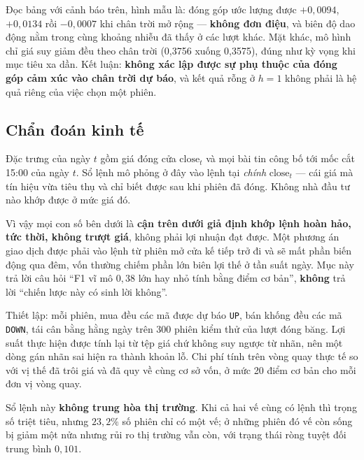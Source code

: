 Đọc bảng với cảnh báo trên, hình mẫu là: đóng góp ước lượng được $+0{,}0094$, $+0{,}0134$
rồi $-0{,}0007$ khi chân trời mở rộng --- \textbf{không đơn điệu}, và biên độ dao động
nằm trong cùng khoảng nhiễu đã thấy ở các lượt khác. Mặt khác, mô hình chỉ giá suy giảm
đều theo chân trời (0,3756 xuống 0,3575), đúng như kỳ vọng khi mục tiêu xa dần. Kết luận:
\textbf{không xác lập được sự phụ thuộc của đóng góp cảm xúc vào chân trời dự báo}, và
kết quả rỗng ở $h = 1$ không phải là hệ quả riêng của việc chọn một phiên.

\subsection{Chẩn đoán kinh tế}
\label{sec:kq-kinh-te}

\begin{tcolorbox}[colback=red!5!white, colframe=red!60!black, title=\textbf{Kết quả trong mục này không giao dịch được}]
Đặc trưng của ngày $t$ gồm giá đóng cửa $\text{close}_t$ và mọi bài tin công bố tới mốc
cắt 15:00 của ngày $t$. Sổ lệnh mô phỏng ở đây vào lệnh tại \emph{chính} $\text{close}_t$
--- cái giá mà tín hiệu vừa tiêu thụ và chỉ biết được sau khi phiên đã đóng. Không nhà đầu
tư nào khớp được ở mức giá đó.

Vì vậy mọi con số bên dưới là \textbf{cận trên dưới giả định khớp lệnh hoàn hảo, tức thời,
không trượt giá}, không phải lợi nhuận đạt được. Một phương án giao dịch được phải vào
lệnh từ phiên mở cửa kế tiếp trở đi và sẽ mất phần biến động qua đêm, vốn thường chiếm
phần lớn biên lợi thế ở tần suất ngày. Mục này trả lời câu hỏi ``F1 vĩ mô $0{,}38$ lớn hay
nhỏ tính bằng điểm cơ bản'', \textbf{không} trả lời ``chiến lược này có sinh lời không''.
\end{tcolorbox}

Thiết lập: mỗi phiên, mua đều các mã được dự báo \texttt{UP}, bán khống đều các mã
\texttt{DOWN}, tái cân bằng hằng ngày trên 300 phiên kiểm thử của lượt đóng băng. Lợi suất
thực hiện được tính lại từ tệp giá chứ không suy ngược từ nhãn, nên một dòng gán nhãn sai
hiện ra thành khoản lỗ. Chi phí tính trên vòng quay thực tế so với vị thế đã trôi giá và
đã quy về cùng cơ sở vốn, ở mức 20 điểm cơ bản cho mỗi đơn vị vòng quay.

Sổ lệnh này \textbf{không trung hòa thị trường}. Khi cả hai vế cùng có lệnh thì trọng số
triệt tiêu, nhưng $23{,}2\%$ số phiên chỉ có một vế; ở những phiên đó vế còn sống bị giảm
một nửa nhưng rủi ro thị trường vẫn còn, với trạng thái ròng tuyệt đối trung bình $0{,}101$.

